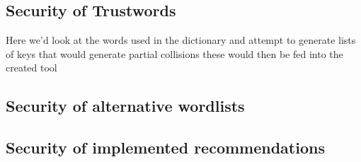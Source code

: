 \subsection{Security of Trustwords}
\label{ref:trustwords}
Here we'd look at the words used in the dictionary and attempt to generate lists of keys that would generate partial collisions these would then be fed into the created tool

\subsection{Security of alternative wordlists}
\label{ref:alternatives}

\subsection{Security of implemented recommendations}
\label{ref:rec}